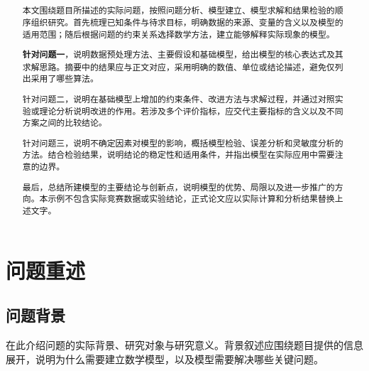 \documentclass{gmcmthesis}
\title{\underline{\makebox[300bp][c]{研究生数学建模竞赛论文题目}}}
\begin{document}
\makecover
\maketitle

\begin{abstract}
本文围绕题目所描述的实际问题，按照问题分析、模型建立、模型求解和结果检验的顺序组织研究。首先梳理已知条件与待求目标，明确数据的来源、变量的含义以及模型的适用范围；随后根据问题的约束关系选择数学方法，建立能够解释实际现象的模型。

\textbf{针对问题一}，说明数据预处理方法、主要假设和基础模型，给出模型的核心表达式及其求解思路。摘要中的结果应与正文对应，采用明确的数值、单位或结论描述，避免仅列出采用了哪些算法。

针对问题二，说明在基础模型上增加的约束条件、改进方法与求解过程，并通过对照实验或理论分析说明改进的作用。若涉及多个评价指标，应交代主要指标的含义以及不同方案之间的比较结论。

针对问题三，说明不确定因素对模型的影响，概括模型检验、误差分析和灵敏度分析的方法。结合检验结果，说明结论的稳定性和适用条件，并指出模型在实际应用中需要注意的边界。

最后，总结所建模型的主要结论与创新点，说明模型的优势、局限以及进一步推广的方向。本示例不包含实际竞赛数据或实验结论，正式论文应以实际计算和分析结果替换上述文字。
\end{abstract}

\tableofcontents

\section{问题重述}
\label{sec:problem}

\subsection{问题背景}
在此介绍问题的实际背景、研究对象与研究意义。背景叙述应围绕题目提供的信息展开，说明为什么需要建立数学模型，以及模型需要解决哪些关键问题。
\end{document}
